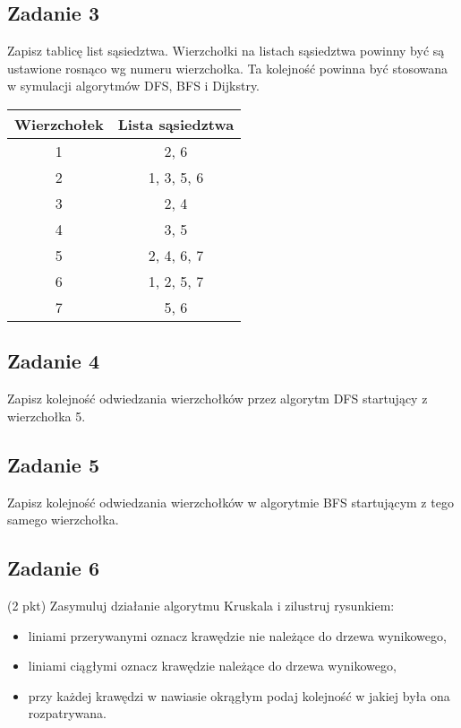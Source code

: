 \documentclass{article}
\begin{document}
\subsection*{Zadanie 3}
Zapisz tablicę list sąsiedztwa. Wierzchołki na listach sąsiedztwa powinny być są ustawione
rosnąco wg numeru wierzchołka. Ta kolejność powinna być stosowana w symulacji algorytmów DFS, BFS i Dijkstry.
\begin{center}
    \begin{tabular}{|c|c|}
        \hline
        Wierzchołek & Lista sąsiedztwa \\
        \hline
        1           & 2, 6             \\
        \hline
        2           & 1, 3, 5, 6       \\
        \hline
        3           & 2, 4             \\
        \hline
        4           & 3, 5             \\
        \hline
        5           & 2, 4, 6, 7       \\
        \hline
        6           & 1, 2, 5, 7       \\
        \hline
        7           & 5, 6             \\
        \hline
    \end{tabular}
\end{center}

\subsection*{Zadanie 4}
Zapisz kolejność odwiedzania wierzchołków przez algorytm DFS startujący z wierzchołka 5.

\subsection*{Zadanie 5}
Zapisz kolejność odwiedzania wierzchołków w algorytmie BFS startującym z tego samego
wierzchołka.

\subsection*{Zadanie 6}
(2 pkt) Zasymuluj działanie algorytmu Kruskala i zilustruj rysunkiem:
\begin{itemize}
    \item liniami przerywanymi oznacz krawędzie nie należące do drzewa wynikowego,
    \item liniami ciągłymi oznacz krawędzie należące do drzewa wynikowego,
    \item przy każdej krawędzi w nawiasie okrągłym podaj kolejność w jakiej była ona rozpatrywana.
\end{itemize}
\end{document}
